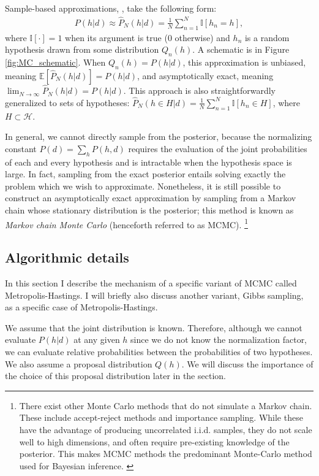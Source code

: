 Sample-based approximations, \citep[also known as \emph{Monte Carlo} approximations][]{robert13}, take the following form:
\begin{align}
P(h|d) \approx \hat{P}_N(h|d) = \frac{1}{N}\sum_{n=1}^N \mathbb{I}[h_n=h],
\end{align}
where $\mathbb{I}[\cdot]=1$ when its argument is true (0 otherwise) and $h_n$ is a random hypothesis drawn from some distribution $Q_n(h)$. A schematic is in Figure \ref{fig:MC_schematic}. When $Q_n(h) = P(h|d)$, this approximation is unbiased, meaning $\mathbb{E}[\hat{P}_N(h|d)] = P(h|d)$, and asymptotically exact, meaning $\lim_{N\rightarrow \infty} \hat{P}_N(h|d) = P(h|d)$. This approach is also straightforwardly generalized to sets of hypotheses: $\hat{P}_N(h \in H|d) = \frac{1}{N}\sum_{n=1}^N \mathbb{I}[h_n \in H]$, where $H \subset \mathcal{H}$. 

In general, we cannot directly sample from the posterior, because the normalizing constant $P(d) = \sum_{h} P(h,d)$ requires the evaluation of the joint probabilities of each and every hypothesis and is intractable when the hypothesis space is large. In fact, sampling from the exact posterior entails solving exactly the problem which we wish to approximate. Nonetheless, it is still possible to construct an asymptotically exact approximation by sampling from a Markov chain whose stationary distribution is the posterior; this method is known as \emph{Markov chain Monte Carlo} (henceforth referred to as MCMC). \footnote{There exist other Monte Carlo methods that do not simulate a Markov chain. These include accept-reject methods and importance sampling. While these have the advantage of producing uncorrelated i.i.d. samples, they do not scale well to high dimensions, and often require pre-existing knowledge of the posterior. This makes MCMC methods the predominant Monte-Carlo method used for Bayesian inference. \cite{neal1993probabilistic, andrieu2003introduction}}

\subsection{Algorithmic details}

In this section I describe the mechanism of a specific variant of MCMC called Metropolis-Hastings. I will briefly also discuss another variant, Gibbs sampling, as a specific case of Metropolis-Hastings.

We assume that the joint distribution is known. Therefore, although we cannot evaluate $P(h | d)$ at any given $h$ since we do not know the normalization factor, we can evaluate relative probabilities between the probabilities of two hypotheses. We also assume a proposal distribution $Q(h)$. We will discuss the importance of the choice of this proposal distribution later in the section. 

